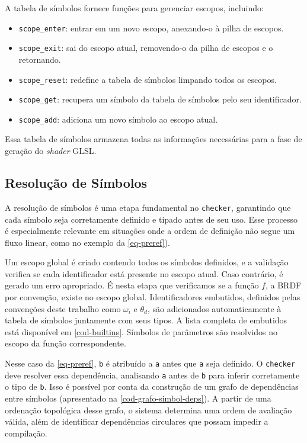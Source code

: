 A tabela de símbolos fornece funções para gerenciar escopos, incluindo:
\begin{itemize}
    \item \texttt{scope\_enter}: entrar em um novo escopo, anexando-o à pilha de escopos.
    \item \texttt{scope\_exit}: sai do escopo atual, removendo-o da pilha de escopos e o retornando.
    \item \texttt{scope\_reset}: redefine a tabela de símbolos limpando todos os escopos.
    \item \texttt{scope\_get}: recupera um símbolo da tabela de símbolos pelo seu identificador.
    \item \texttt{scope\_add}: adiciona um novo símbolo ao escopo atual.
\end{itemize}

Essa tabela de símbolos armazena todas as informações necessárias para a fase de geração do \textit{shader} GLSL.


\subsection{Resolução de Símbolos} \label{subsection-sym-resolution}
A resolução de símbolos é uma etapa fundamental no \texttt{checker}, garantindo que cada símbolo seja corretamente definido e tipado antes de seu uso. Esse processo é especialmente relevante em situações onde a ordem de definição não segue um fluxo linear, como no exemplo da \autoref{eq-preref}).

Um escopo global é criado contendo todos os símbolos definidos, e a validação verifica se cada identificador está presente no escopo atual. Caso contrário, é gerado um erro apropriado. É nesta etapa que verificamos se a função $f$, a BRDF por convenção, existe no escopo global. Identificadores embutidos, definidos pelas convenções deste trabalho como $\omega_i$ e $\theta_d$, são adicionados automaticamente à tabela de símbolos juntamente com seus tipos. A lista completa de embutidos está disponível em \autoref{cod-builtins}. Símbolos de parâmetros são resolvidos no escopo da função correspondente.




Nesse caso da \autoref{eq-preref}, \texttt{b} é atribuído a \texttt{a} antes que \texttt{a} seja definido. O \texttt{checker} deve resolver essa dependência, analisando \texttt{a} antes de \texttt{b} para inferir corretamente o tipo de \texttt{b}. Isso é possível por conta da construção de um grafo de dependências entre símbolos (apresentado na \autoref{cod-grafo-simbol-deps}). A partir de uma ordenação topológica desse grafo, o sistema determina uma ordem de avaliação válida, além de identificar dependências circulares que possam impedir a compilação.

